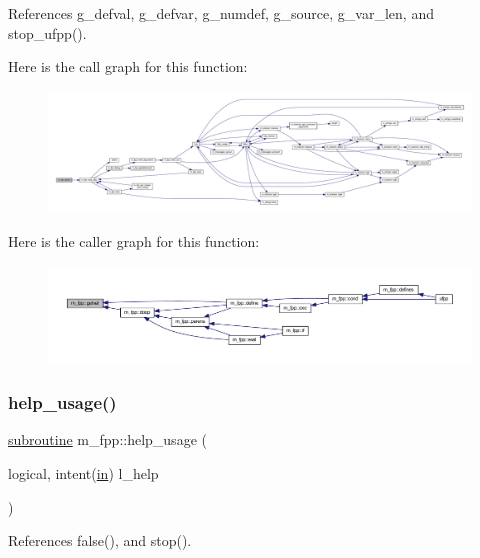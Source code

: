 References g\+\_\+defval, g\+\_\+defvar, g\+\_\+numdef, g\+\_\+source, g\+\_\+var\+\_\+len, and stop\+\_\+ufpp().

Here is the call graph for this function\+:
\nopagebreak
\begin{figure}[H]
\begin{center}
\leavevmode
\includegraphics[width=350pt]{namespacem__fpp_a77ebcaafb7e1396c68dbc0bdcc088232_cgraph}
\end{center}
\end{figure}
Here is the caller graph for this function\+:
\nopagebreak
\begin{figure}[H]
\begin{center}
\leavevmode
\includegraphics[width=350pt]{namespacem__fpp_a77ebcaafb7e1396c68dbc0bdcc088232_icgraph}
\end{center}
\end{figure}
\mbox{\label{namespacem__fpp_a17c5179799e6700fe39fb3bd2ec85d01}} 
\subsubsection{\texorpdfstring{help\+\_\+usage()}{help\_usage()}}
{\footnotesize\ttfamily \hyperlink{M__stopwatch_83_8txt_acfbcff50169d691ff02d4a123ed70482}{subroutine} m\+\_\+fpp\+::help\+\_\+usage (\begin{DoxyParamCaption}\item[{logical, intent(\hyperlink{M__journal_83_8txt_afce72651d1eed785a2132bee863b2f38}{in})}]{l\+\_\+help }\end{DoxyParamCaption})}



References false(), and stop().

